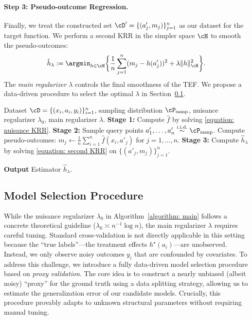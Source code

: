\documentclass[english,11pt]{article}
\begin{document}
\paragraph{Step 3: Pseudo-outcome Regression.}
Finally, we treat the constructed set $\cD' = \{(a'_j, m_j)\}_{j=1}^n$ as our dataset for the target function. We perform a second KRR in the simpler space $\cH$ to smooth the pseudo-outcomes:
\begin{equation}\label{equation: second KRR}
	\hat{h}_\lambda := \argmin_{h \in \cH} \bigg\{\frac{1}{n}\sum_{j=1}^n (m_j - h(a'_j))^2 + \lambda \|h\|_\cH^2 \bigg\}.
\end{equation}
The \textit{main regularizer} $\lambda$ controls the final smoothness of the TEF. 
We propose a data-driven procedure to select the optimal $\lambda$ in Section~\ref{subsection: model selection algorithm}.

\begin{algorithm}[h]
	\caption{TEF Estimation via Two-Stage KRR}
	\label{algorithm: main}
	\begin{algorithmic}[1]
		\REQUIRE Dataset $\cD = \{(x_i, a_i, y_i)\}_{i=1}^n$, sampling distribution $\cP_{\operatorname{samp}}$, nuisance regularizer $\lambda_0$, main regularizer \(\lambda\).
		\STATE \textbf{Stage 1:} Compute $\hat{f}$ by solving \cref{equation: nuisance KRR}.
		\STATE \textbf{Stage 2:} Sample query points $a'_1, \dots, a'_n \overset{\text{i.i.d.}}{\sim} \cP_{\operatorname{samp}}$.
		\STATE Compute pseudo-outcomes: $m_j \leftarrow \frac{1}{n} \sum_{i=1}^n \hat{f}(x_i, a'_j)$ for $j=1, \dots, n$.
		\STATE \textbf{Stage 3:} Compute $\hat{h}_\lambda$ by solving \cref{equation: second KRR} on $\{(a'_j, m_j)\}_{j=1}^n$.
        
		\textbf{Output} Estimator $\hat{h}_\lambda$.
	\end{algorithmic}
\end{algorithm}

\subsection{Model Selection Procedure}\label{subsection: model selection algorithm}

While the nuisance regularizer $\lambda_0$ in Algorithm~\ref{algorithm: main} follows a concrete theoretical guideline ($\lambda_0 \asymp n^{-1} \log n$), the main regularizer $\lambda$ requires careful tuning.
Standard cross-validation is not directly applicable in this setting because the ``true labels''—the treatment effects $h^\star(a_i)$—are unobserved. Instead, we only observe noisy outcomes $y_i$ that are confounded by covariates.
To address this challenge, we introduce a fully data-driven model selection procedure based on \textit{proxy validation}.
The core idea is to construct a nearly unbiased (albeit noisy) ``proxy'' for the ground truth using a data splitting strategy, allowing us to estimate the generalization error of our candidate models.
Crucially, this procedure provably adapts to unknown structural parameters without requiring manual tuning.
\end{document}
